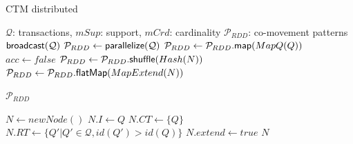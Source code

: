 \documentclass[
]{ceurart}
\renewcommand{\sf}[1]{\textsf{\textup{#1}}}
\begin{document}
\begin{algorithm}[t]
\caption{CTM distributed}\label{alg:colossal-distributed}
\scriptsize\centering
\begin{algorithmic}[1]
\Require $\mathcal{Q}$: transactions, $mSup$: support, $mCrd$: cardinality
\Ensure $\mathcal{P}_{RDD}$: co-movement patterns
\State $\sf{broadcast}(\mathcal{Q})$                                            \label{alg:dist01}
\State $\mathcal{P}_{RDD} \gets \sf{parallelize}(\mathcal{Q})$                                   \label{alg:dist02}
    \State $\mathcal{P}_{RDD} \gets \mathcal{P}_{RDD}\sf{.map}(MapQ(Q))$                                                        \label{alg:dist03}
    \Do                        \label{alg:dist10}                                                                                     
        \State $acc \gets false$                                     \label{alg:dist11}
            \State $\mathcal{P}_{RDD} \gets \mathcal{P}_{RDD}\sf{.shuffle}(Hash(N))$                                \label{alg:dist14}
            \State $\mathcal{P}_{RDD} \gets \mathcal{P}_{RDD}\sf{.flatMap}(MapExtend(N))$
            \item[]                                     \label{alg:dist15}
                                                \label{alg:dist22}
    \State \Return $\mathcal{P}_{RDD}$
    \item[]
     
        \State $N \gets newNode()$ 
        \State $N.I \gets Q$                                                          \label{alg:dist04}
        \State $N.CT \gets \{ Q \}$  \label{alg:dist05}
        \State $N.RT \gets \{ Q' | Q' \in \mathcal{Q}, id(Q') > id(Q) \}$  \label{alg:dist06}
        \State $N.extend \gets true$                                      \label{alg:dist07}
        \State \Return $N$                                                   \label{alg:dist08}
    \EndFunction
    \item[]
     
          \label{alg:dist16}
        

\end{algorithmic}
\end{algorithm}
\end{document}
